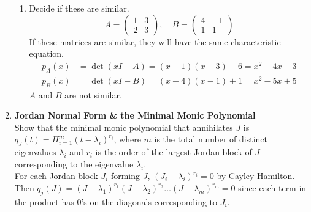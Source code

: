 \documentclass[a4paper]{article}
\begin{document}
\begin{enumerate}
\begin{enumerate}
	\item Decide if these are similar.
	$$
	A = \begin{pmatrix}
	1 & 3 \\ 2 & 3
	\end{pmatrix}, \quad
	B = \begin{pmatrix}
	4 & -1 \\ 1 & 1
	\end{pmatrix}
	$$
	If these matrices are similar, they will have the same 
	characteristic equation. \\
	\begin{align*}
	p_A(x) &= \det(xI - A) = (x-1)(x-3) - 6 = x^2 - 4x -3 \\
	p_B(x) &= \det(xI-B) = (x-4)(x-1) + 1 = x^2 - 5x + 5
	\end{align*}
	$A$ and $B$ are not similar. 
	
\end{enumerate}

\newpage
\item{\textbf{Jordan Normal Form \& the Minimal Monic Polynomial}}\\
Show that the minimal monic polynomial that annihilates $J$ is 
$q_J(t) = \Pi_{i=1}^m (t-\lambda_i)^{r_i}$, where $m$ is the
total number of distinct eigenvalues $\lambda_i$ and $r_i$
is the order of the largest Jordan block of $J$ corresponding
to the eigenvalue $\lambda_i$.\\

For each Jordan block $J_i$ forming $J$, $(J_i - \lambda_i)^{r_i} = 0$ by Cayley-Hamilton. Then $q_j(J) = (J-\lambda_1)^{r_1}(J-\lambda_2)^{r_2}\dots (J- \lambda_m)^{r_m} = 0$ since each term in the product has 0's on the diagonals corresponding to $J_i$. 

\end{enumerate}
\end{document}
